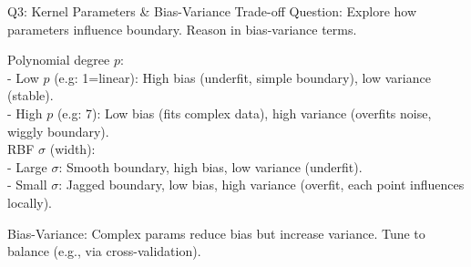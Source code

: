 \documentclass[10pt]{beamer}
\begin{document}
\begin{frame}{Q3: Kernel Parameters \& Bias-Variance Trade-off}
\alert{Question:} Explore how parameters influence boundary. Reason in bias-variance terms.

\vspace{1em}

Polynomial degree $p$: \\
- Low $p$ (e.g: 1=linear): High bias (underfit, simple boundary), low variance (stable). \\
- High $p$ (e.g: 7): Low bias (fits complex data), high variance (overfits noise, wiggly boundary). \\

RBF $\sigma$ (width): \\
- Large $\sigma$: Smooth boundary, high bias, low variance (underfit). \\
- Small $\sigma$: Jagged boundary, low bias, high variance (overfit, each point influences locally).

\vspace{1em}

\alert{Bias-Variance:} Complex params reduce bias but increase variance. Tune to balance (e.g., via cross-validation).
\end{frame}
\end{document}
